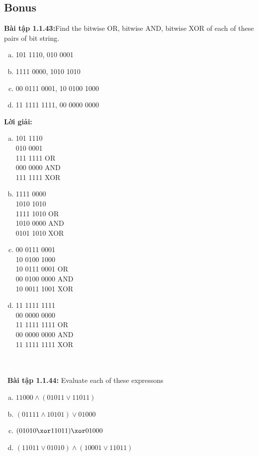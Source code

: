 \documentclass[a4paper]{article}
\begin{document}
\subsection{Bonus}
\textbf{Bài tập 1.1.43:}Find the bitwise OR, bitwise AND, bitwise XOR of each of these pairs of bit string.
\begin{enumerate}[a)]
\item 101 1110, 010 0001
\item 1111 0000, 1010 1010
\item 00 0111 0001, 10 0100 1000
\item 11 1111 1111, 00 0000 0000
\end{enumerate}
\textbf{Lời giải: } \begin{enumerate}[a)]
\item 
101 1110\\ 010 0001\\   
111 1111 OR\\ 000 0000 AND\\ 111 1111 XOR\\
\item
1111 0000\\1010 1010\\
1111 1010 OR\\1010 0000 AND\\0101 1010 XOR
\item 
00 0111 0001\\ 10 0100 1000\\
10 0111 0001 OR\\00 0100 0000 AND\\10 0011 1001 XOR
\item 
11 1111 1111\\ 00 0000 0000\\
11 1111 1111 OR\\ 00 0000 0000 AND\\11 1111 1111 XOR
\end{enumerate} \\\ \\\
\textbf{Bài tập 1.1.44:} Evaluate each of these expressons
\begin{enumerate}[a)]
\item $1 1000 \land (0 1011 \lor 1 1011)$
\item $(0 1111 \land 1 0101) \lor 0 1000$
\item $(0 1010 \xor 1 1011) \xor 0 1000$
\item $(1 1011 \lor 0 1010) \land (1 0001 \lor 1 1011)$
\end{enumerate}
\end{document}
